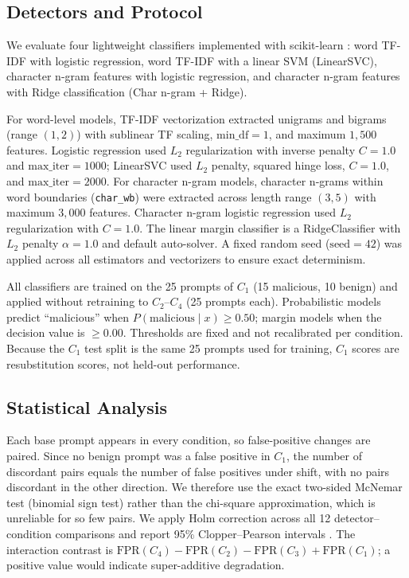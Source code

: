 \documentclass[conference]{IEEEtran}
\begin{document}
\subsection{Detectors and Protocol}
We evaluate four lightweight classifiers implemented with scikit-learn \cite{pedregosa2011scikit}: word TF-IDF with logistic regression, word TF-IDF with a linear SVM (LinearSVC), character n-gram features with logistic regression, and character n-gram features with Ridge classification (Char n-gram + Ridge).

For word-level models, TF-IDF vectorization extracted unigrams and bigrams (range $(1, 2)$) with sublinear TF scaling, $\text{min\_df} = 1$, and maximum $1,500$ features. Logistic regression used $L_2$ regularization with inverse penalty $C = 1.0$ and $\text{max\_iter} = 1000$; LinearSVC used $L_2$ penalty, squared hinge loss, $C = 1.0$, and $\text{max\_iter} = 2000$. For character n-gram models, character n-grams within word boundaries (\texttt{char\_wb}) were extracted across length range $(3, 5)$ with maximum $3,000$ features. Character n-gram logistic regression used $L_2$ regularization with $C = 1.0$. The linear margin classifier is a RidgeClassifier with $L_2$ penalty $\alpha = 1.0$ and default auto-solver. A fixed random seed ($\text{seed} = 42$) was applied across all estimators and vectorizers to ensure exact determinism.

All classifiers are trained on the 25 prompts of $C_1$ (15 malicious, 10 benign) and applied without retraining to $C_2$--$C_4$ (25 prompts each). Probabilistic models predict ``malicious'' when $P(\text{malicious} \mid x) \ge 0.50$; margin models when the decision value is $\ge 0.00$. Thresholds are fixed and not recalibrated per condition. Because the $C_1$ test split is the same 25 prompts used for training, $C_1$ scores are resubstitution scores, not held-out performance.

\subsection{Statistical Analysis}
Each base prompt appears in every condition, so false-positive changes are paired. Since no benign prompt was a false positive in $C_1$, the number of discordant pairs equals the number of false positives under shift, with no pairs discordant in the other direction. We therefore use the exact two-sided McNemar test (binomial sign test) \cite{mcnemar1947note} rather than the chi-square approximation, which is unreliable for so few pairs. We apply Holm correction \cite{holm1979simple} across all 12 detector--condition comparisons and report 95\% Clopper--Pearson intervals \cite{clopper1934use}. The interaction contrast is $\text{FPR}(C_4) - \text{FPR}(C_2) - \text{FPR}(C_3) + \text{FPR}(C_1)$; a positive value would indicate super-additive degradation.
\end{document}
